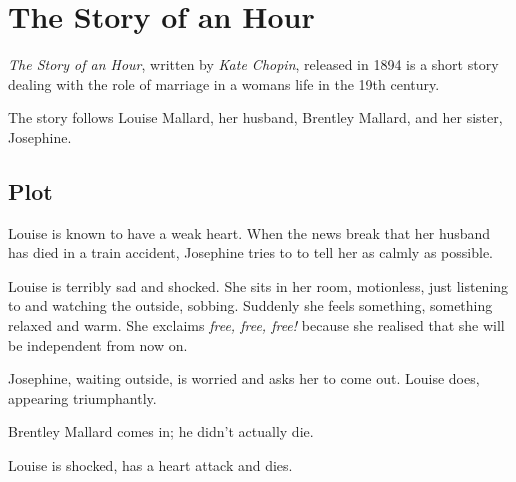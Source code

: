 \documentclass{article}
\begin{document}
\section{The Story of an Hour}
\emph{The Story of an Hour}, written by \emph{Kate Chopin}, released in 1894 is a short story dealing with the role of marriage in a womans life in the 19th century.
 
The story follows Louise Mallard, her husband, Brentley Mallard, and her sister, Josephine.
 
\subsection{Plot}
Louise is known to have a weak heart. When the news break that her husband has died in a train accident, Josephine tries to to tell her as calmly as possible.
 
Louise is terribly sad and shocked. She sits in her room, motionless, just listening to and watching the outside, sobbing. Suddenly she feels something, something relaxed and warm. She exclaims \emph{free, free, free!} because she realised that she will be independent from now on.
 
Josephine, waiting outside, is worried and asks her to come out. Louise does, appearing triumphantly.
 
Brentley Mallard comes in; he didn't actually die.
 
Louise is shocked, has a heart attack and dies.
 
\end{document}
